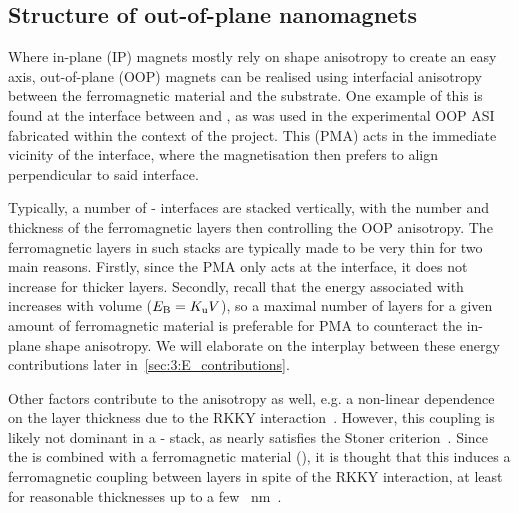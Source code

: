 \subsection{Structure of out-of-plane nanomagnets} %
\label{sec:3:OOP_nanomagnet_PMA}
Where in-plane (IP) magnets mostly rely on shape anisotropy to create an easy axis, out-of-plane (OOP) magnets can be realised using interfacial anisotropy between the ferromagnetic material and the substrate.
One example of this is found at the interface between  and , as was used in the experimental OOP ASI fabricated within the context of the \spinengine project.
This  (PMA) acts in the immediate vicinity of the interface, where the magnetisation then prefers to align perpendicular to said interface. \par
Typically, a number of - interfaces are stacked vertically, with the number and thickness of the ferromagnetic  layers then controlling the OOP anisotropy.
The ferromagnetic layers in such stacks are typically made to be very thin for two main reasons.
Firstly, since the PMA only acts at the interface, it does not increase for thicker layers.
Secondly, recall that the energy associated with  increases with volume ($E_\mathrm{B}=K_\mathrm{u}V$), so a maximal number of layers for a given amount of ferromagnetic material is preferable for PMA to counteract the in-plane shape anisotropy.
We will elaborate on the interplay between these energy contributions later in~\cref{sec:3:E_contributions}. \par
Other factors contribute to the anisotropy as well, e.g. a non-linear dependence on the  layer thickness due to the RKKY interaction~\cite{RKKY_RK,RKKY_K,RKKY_Y}.
However, this coupling is likely not dominant in a - stack, as  nearly satisfies the Stoner criterion~\cite{PtMagneticOrder}.
Since the  is combined with a ferromagnetic material (), it is thought that this induces a ferromagnetic coupling between  layers in spite of the RKKY interaction, at least for reasonable  thicknesses up to a few \SI{}{\nano\metre}~\cite{PerpendicularMagnetizationASI}.

